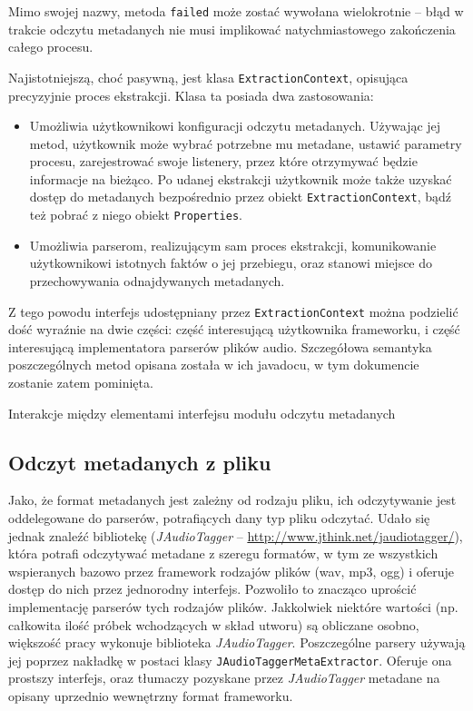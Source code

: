 \begin{Note}
Mimo swojej nazwy, metoda \texttt{failed} może zostać wywołana wielokrotnie -- błąd w trakcie
odczytu metadanych nie musi implikować natychmiastowego zakończenia całego procesu.
\end{Note}


Najistotniejszą, choć pasywną, jest klasa \texttt{ExtractionContext}, opisująca precyzyjnie proces
ekstrakcji. Klasa ta posiada dwa zastosowania:

\begin{itemize}
  \item Umożliwia użytkownikowi konfiguracji odczytu metadanych. Używając jej metod, użytkownik może
wybrać potrzebne mu metadane, ustawić parametry procesu, zarejestrować swoje listenery, przez które
otrzymywać będzie informacje na bieżąco. Po udanej ekstrakcji użytkownik może także uzyskać dostęp
do metadanych bezpośrednio przez obiekt \texttt{ExtractionContext}, bądź też pobrać z niego obiekt
\texttt{Properties}.

  \item Umożliwia parserom, realizującym sam proces ekstrakcji, komunikowanie użytkownikowi
istotnych faktów o jej przebiegu, oraz stanowi miejsce do przechowywania odnajdywanych metadanych.

\end{itemize}

Z tego powodu interfejs udostępniany przez \texttt{ExtractionContext} można podzielić dość wyraźnie
na dwie części: część interesującą użytkownika frameworku, i część interesującą implementatora
parserów plików audio. Szczegółowa semantyka poszczególnych metod opisana została w ich javadocu,
w tym dokumencie zostanie zatem pominięta.

{Interakcje między elementami interfejsu modułu odczytu metadanych}


\subsection{Odczyt metadanych z pliku}
\label{sec:metadane_odczyt}

Jako, że format metadanych jest zależny od rodzaju pliku, ich odczytywanie jest oddelegowane do
parserów, potrafiących dany typ pliku odczytać. Udało się jednak znaleźć bibliotekę
(\emph{JAudioTagger} -- \url{http://www.jthink.net/jaudiotagger/}), która potrafi odczytywać
metadane z szeregu formatów, w tym ze wszystkich wspieranych bazowo przez framework rodzajów plików
(wav, mp3, ogg) i oferuje dostęp do nich przez jednorodny interfejs. Pozwoliło to znacząco uprościć
implementację parserów tych rodzajów plików.  Jakkolwiek niektóre wartości (np. całkowita ilość
próbek wchodzących w skład utworu) są obliczane osobno, większość pracy wykonuje biblioteka
\emph{JAudioTagger}. Poszczególne parsery używają jej poprzez nakładkę w postaci klasy
\texttt{JAudioTaggerMetaExtractor}. Oferuje ona prostszy interfejs, oraz tłumaczy pozyskane przez
\emph{JAudioTagger} metadane na opisany uprzednio wewnętrzny format frameworku.


